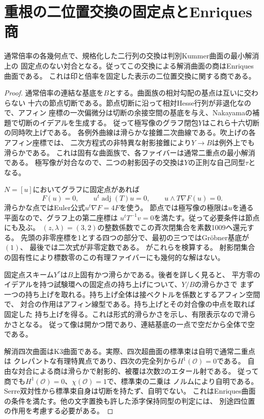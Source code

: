 \section{重根の二位置交換の固定点とEnriques商}
\label{sec:kummer-exchange-quotient}
\begin{theorem}\label{thm:kummer-exchange-enriques}
通常倍率の各幾何点で、規格化した二行列の交換は判別Kummer曲面の最小解消上の
固定点のない対合となる。従ってこの交換による解消曲面の商はEnriques曲面である。
これは印と倍率を固定した表示の二位置交換に関する商である。
\end{theorem}
\begin{proof}
通常倍率の連結な基底を$B$とする。曲面族の相対勾配の基点は互いに交わらない
十六の節点切断である。節点切断に沿って相対Hesse行列が非退化なので、アフィン
座標の一次偏微分は切断の余接空間の基底を与え、Nakayamaの補題で切断のイデアルを生成する。
従って極写像のグラフ閉包$Y$はこれら十六切断の同時吹上げである。
各例外曲線は滑らかな接錐二次曲線である。吹上げの各アフィン座標では、
二次方程式の非特異な射影接錐により$Y\to B$は例外上でも滑らかである。
これは固有な曲面族で、各ファイバーは通常二重点の最小解消である。
極写像が対合なので、二つの射影因子の交換は$Y$の正則な自己同型$\tau$となる。

$N=[u]$においてグラフに固定点があれば
\[
 F(u)=0,\qquad u^t\operatorname{adj}(T)u=0,\qquad
 u\wedge T\nabla F(u)=0 .
\]
滑らかな点ではEuler公式$u^t\nabla F=4F$を使う。
節点では極写像の極限は$u$を通る平面なので、グラフ上の第二座標は
$u^tT^{-1}v=0$を満たす。従って必要条件は節点にも及ぶ。
$(z,\lambda)=(3,2)$の整数係数でこの斉次閉集合を素数1009へ還元する。
先頭の非零座標を1とする四つの部分で、最初の三つではGröbner基底が$(1)$、
最後では二次式が非零定数である。
がこれらを検算する。
射影閉集合の固有性により標数零のこの有理ファイバーにも幾何的な解はない。

固定点スキーム$Y^\tau$は$B$上固有かつ滑らかである。後者を詳しく見ると、
平方零のイデアルを持つ試験環への固定点の持ち上げについて、$Y/B$の滑らかさで
まず一つの持ち上げを取れる。持ち上げ全体は接ベクトルを係数とするアフィン空間で、
対合の作用はアフィン線型である。持ち上げとその対合像の中点を取れば固定した
持ち上げを得る。これは形式的滑らかさを示し、有限表示なので滑らかさとなる。
従って像は開かつ閉であり、連結基底の一点で空だから全体で空である。

解消四次曲面はK3曲面である。実際、四次超曲面の標準束は自明で通常二重点は
クレパントな有理特異点であり、四次の完全列から$H^1(\mathcal O)=0$である。
自由な対合による商は滑らかで射影的、被覆は次数2のエタール射である。
従って商でも$H^1(\mathcal O)=0$、$\chi(\mathcal O)=1$で、標準束の二乗は
ノルムにより自明である。Serre双対性から標準束自身は切断を持たず、自明でない。
これはEnriques曲面の条件を満たす。他の文字置換も許した添字保持同型の判定には、
別途四位置の作用を考慮する必要がある。
\end{proof}

